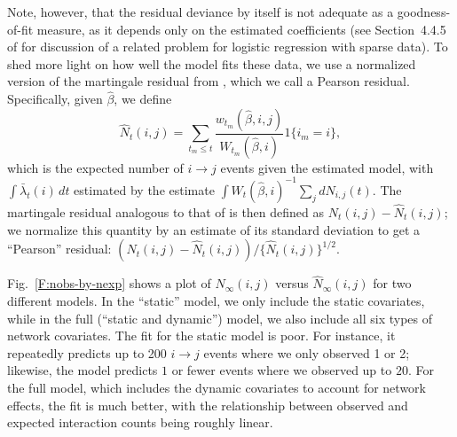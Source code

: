 \documentclass[final]{statsoc}
\begin{document}
Note, however, that the residual deviance by itself is not adequate as a goodness-of-fit measure,
as it depends only on the estimated coefficients (see Section~4.4.5 of
\cite{mccullagh1989generalized} for discussion of a related problem for logistic
regression with sparse data).  To shed more light on how well the model fits
these data, we use a normalized version of the martingale residual from
\cite{therneau1990martingale}, which we call a Pearson residual.
Specifically, given $\hat \beta$, we define
\[
  \hat N_{t}(i,j)
    = \sum_{t_m \leq t}
        \frac{w_{t_m}(\hat \beta, i, j)}{W_{t_m}(\hat \beta, i)}
        1\{i_m = i\},
\]
which is the expected number of $i \to j$ events given the estimated model,
with $\int \bar \lambda_t(i) \, dt$ estimated by the
\cite{breslow1974covariance} estimate $\int W_t(\hat \beta, i)^{-1} \sum_j dN_{i,j}(t)$.  The martingale residual analogous to that of \cite{therneau1990martingale} is then
defined as $N_t(i,j) - \hat N_t(i,j)$; we normalize this quantity by an
estimate of its standard deviation to get a ``Pearson'' residual:
\(
    {(N_t(i,j) - \hat N_t(i,j))}/\{\hat N_t(i,j)\}^{1/2}.
\)

Fig.~\ref{F:nobs-by-nexp} shows a plot of $N_\infty(i,j)$ versus $\hat
N_\infty(i,j)$ for two different models.  In the ``static'' model, we only
include the static covariates, while in the full (``static and dynamic'') model,
we also include all six types of network covariates.  The fit for the static model
is poor.  For instance, it repeatedly predicts up to 200 $i \to
j$ events where we only observed 1 or 2; likewise, the model predicts $1$ or
fewer events where we observed up to $20$.  For the full model, which includes
the dynamic covariates to account for network effects, the fit is much better, with the relationship between
observed and expected interaction counts being roughly linear.
\end{document}
